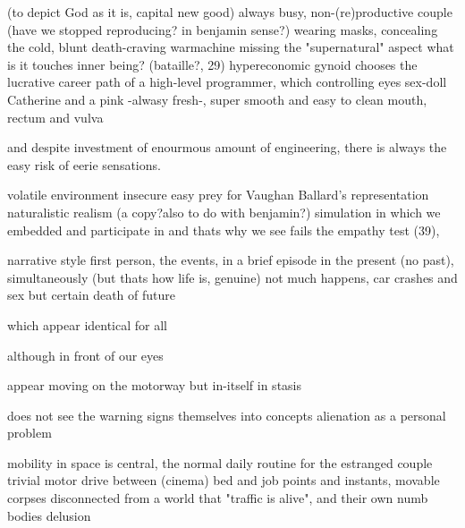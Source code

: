 \documentclass{article}
\begin{document}
(to depict God as it is, capital new good)
always busy, non-(re)productive couple (have we stopped reproducing? in benjamin sense?)
wearing masks, concealing the cold, blunt death-craving warmachine
missing the "supernatural" aspect what is it touches inner being? (bataille?, 29)
hypereconomic gynoid 
chooses the lucrative career path of a high-level programmer, 
which controlling eyes 
sex-doll
Catherine and a pink -alwasy fresh-, super smooth and easy to clean mouth, rectum and vulva

and despite investment of enourmous amount of engineering, there is always the 
easy risk of eerie sensations. 


volatile environment 
insecure easy prey for  Vaughan
Ballard's representation naturalistic realism
(a copy?also to do with benjamin?)
simulation in which we embedded and participate in
and thats why we see
fails the empathy test (39), 

narrative style
first person, 
the events, in a brief episode in the present (no past), 
simultaneously (but thats how life is, genuine)
not much happens, car crashes and sex
but certain death of future


which appear identical for all


although in front of our eyes

appear moving on the motorway
but in-itself in stasis

does not see the warning signs themselves into concepts
alienation as a personal problem


mobility in space is central, 
the normal daily routine for the estranged couple  
trivial motor drive between (cinema) bed and job
points and instants, 
movable corpses
disconnected from a world that "traffic is alive", 
and their own numb bodies
delusion
\end{document}
